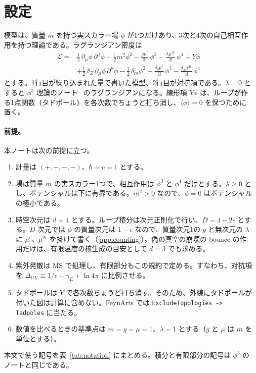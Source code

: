 \documentclass[a4paper,10pt]{ltjsarticle}
\begin{document}
\section{設定}\label{sec:setup}

模型は、質量 $m$ を持つ実スカラー場 $\phi$ が1つだけあり、3次と4次の自己相互作用を持つ理論である。ラグランジアン密度は
\begin{equation}
\begin{aligned}
\mathcal{L}={}&\frac12\,\partial_\mu\phi\,\partial^\mu\phi-\frac12 m^2\phi^2-\frac{g\mu^{\epsilon}}{3!}\,\phi^3-\frac{\lambda\mu^{2\epsilon}}{4!}\,\phi^4+Y\phi\\
&+\frac12\,\delta_Z\,\partial_\mu\phi\,\partial^\mu\phi-\frac12\,\delta_m\phi^2-\frac{\delta_g\mu^{\epsilon}}{3!}\,\phi^3-\frac{\delta_\lambda\mu^{2\epsilon}}{4!}\,\phi^4
\end{aligned}
\label{eq:L}
\end{equation}
とする。1行目が繰り込まれた量で書いた模型、2行目が対抗項である。$\lambda=0$ とすると $\phi^3$ 理論のノート~\cite{phi3note} のラグランジアンになる。線形項 $Y\phi$ は、ループが作る1点関数（タドポール）を各次数でちょうど打ち消し、$\langle\phi\rangle=0$ を保つために置く。

\paragraph{前提。}本ノートは次の前提に立つ。
\begin{enumerate}
\item 計量は $(+,-,-,-)$、$\hbar=c=1$ とする。
\item 場は質量 $m$ の実スカラー1つで、相互作用は $\phi^3$ と $\phi^4$ だけとする。$\lambda\ge0$ とし、ポテンシャルは下に有界である。$m^2>0$ なので、$\phi=0$ はポテンシャルの極小である。
\item 時空次元は $d=4$ とする。ループ積分は次元正則化で行い、$D=4-2\epsilon$ とする。$D$ 次元では $\phi$ の質量次元は $1-\epsilon$ なので、質量次元1の $g$ と無次元の $\lambda$ に $\mu^\epsilon$、$\mu^{2\epsilon}$ を掛けて書く（\ref{app:counting}）。偽の真空の崩壊の bounce の作用だけは、有限温度の核生成の目安として $d=3$ でも求める。
\item 紫外発散は $\overline{\mathrm{MS}}$ で処理し、有限部分もこの規約で定める。すなわち、対抗項を $\Delta_{\mathrm{UV}}\equiv1/\epsilon-\gamma_E+\ln4\pi$ に比例させる。
\item タドポールは $Y$ で各次数ちょうど打ち消す。そのため、外線にタドポールが付いた図は計算に含めない。FeynArts では \texttt{ExcludeTopologies -> Tadpoles} に当たる。
\item 数値を比べるときの基準点は $m=g=\mu=1$、$\lambda=1$ とする（$g$ と $\mu$ は $m$ を単位とする）。
\end{enumerate}
本文で使う記号を表~\ref{tab:notation} にまとめる。積分と有限部分の記号は $\phi^3$ のノートと同じである。
\end{document}
